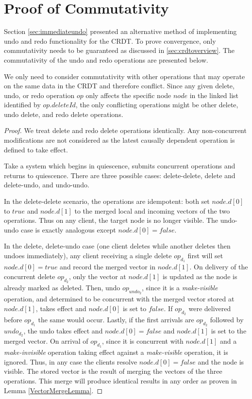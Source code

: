 \documentclass[12pt,a4paper,twoside,openright]{report}
\begin{document}
\section{Proof of Commutativity} \label{appendix:immundoproof}

Section \cref{sec:immediateundo} presented an alternative method of implementing undo and redo functionality for the CRDT. To prove convergence, only commutativity needs to be guaranteed as discussed in \cref{sec:crdtoverview}. The commutativity of the undo and redo operations are presented below.

We only need to consider commutativity with other operations that may operate on the same data in the CRDT and therefore conflict. Since any given delete, undo, or redo operation $op$ only affects the specific node $node$ in the linked list identified by $op.deleteId$, the only conflicting operations might be other delete, undo delete, and redo delete operations.
						
	\begin{proof}
	
		We treat delete and redo delete operations identically. Any non-concurrent modifications are not considered as the latest causally dependent operation is defined to take effect.
		
		Take a system which begins in quiescence, submits concurrent operations and returns to quiescence. There are three possible cases: delete-delete, delete and delete-undo, and undo-undo.
		
		In the delete-delete scenario, the operations are idempotent: both set $node.d[0]$ to $true$ and $node.d[1]$ to the merged local and incoming vectors of the two operations. Thus on any client, the target node is no longer visible. The undo-undo case is exactly analogous except $node.d[0] = false$. 
		
		In the delete, delete-undo case (one client deletes while another deletes then undoes immediately), any client receiving a single delete $op_{d_1}$ first will set $node.d[0] = true$ and record the merged vector in $node.d[1]$. On delivery of the concurrent delete $op_{d_2}$, only the vector at $node.d[1]$ is updated as the node is already marked as deleted. Then, undo $op_{undo_2}$, since it is a \textit{make-visible} operation, and determined to be concurrent with the merged vector stored at $node.d[1]$, takes effect and $node.d[0]$ is set to $false$. If $op_{d_2}$ were delivered before $op_{d_1}$ the same would occur. Lastly, if the first arrivals are $op_{d_2}$ followed by $undo_{d_2}$, the undo takes effect and $node.d[0] = false$ and $node.d[1]$ is set to the merged vector. On arrival of $op_{d_1}$, since it is concurrent with $node.d[1]$ and a \textit{make-invisible} operation taking effect against a \textit{make-visible} operation, it is ignored. Thus, in any case the clients resolve $node.d[0] = false$ and the node is visible. The stored vector is the result of merging the vectors of the three operations. This merge will produce identical results in any order as proven in Lemma \ref{VectorMergeLemma}.
		
	\end{proof}
	
\end{document}
